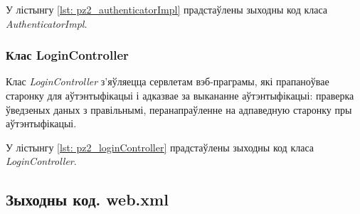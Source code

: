 У лістынгу \ref{lst: pz2_authenticatorImpl} прадстаўлены зыходны код класа \textit{AuthenticatorImpl}.



\subsubsection{Клас LoginController}

Клас \textit{LoginController} з'яўляецца сервлетам
вэб-праграмы, які прапаноўвае старонку для аўтэнтыфікацыі
і адказвае за выкананне аўтэнтыфікацыі:
праверка ўведзеных даных з правільнымі,
перанапраўленне на адпаведную старонку пры аўтэнтыфікацыі.

У лістынгу \ref{lst: pz2_loginController} прадстаўлены зыходны код класа \textit{LoginController}.



\subsection{Зыходны код. web.xml}


